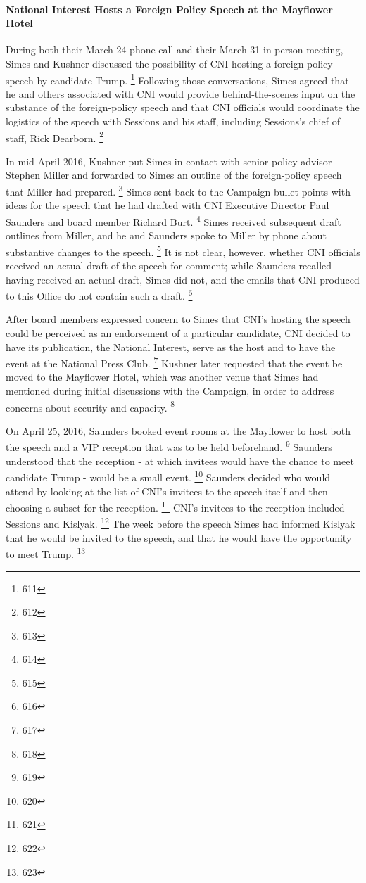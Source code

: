 \paragraph{National Interest Hosts a Foreign Policy Speech at the Mayflower Hotel}

During both their March 24 phone call and their March 31 in-person meeting, Simes and Kushner discussed the possibility of CNI hosting a foreign policy speech by candidate Trump.%
\footnote{611}
Following those conversations, Simes agreed that he and others associated with CNI would provide behind-the-scenes input on the substance of the foreign-policy speech and that CNI officials would coordinate the logistics of the speech with Sessions and his staff, including Sessions's chief of staff, Rick Dearborn.%
\footnote{612}

In mid-April 2016, Kushner put Simes in contact with senior policy advisor Stephen Miller and forwarded to Simes an outline of the foreign-policy speech that Miller had prepared.%
\footnote{613}
Simes sent back to the Campaign bullet points with ideas for the speech that he had drafted with CNI Executive Director Paul Saunders and board member Richard Burt.%
\footnote{614}
Simes received subsequent draft outlines from Miller, and he and Saunders spoke to Miller by phone about substantive changes to the speech.%
\footnote{615}
It is not clear, however, whether CNI officials received an actual draft of the speech for comment; while Saunders recalled having received an actual draft, Simes did not, and the emails that CNI produced to this Office do not contain such a draft.%
\footnote{616}

After board members expressed concern to Simes that CNI's hosting the speech could be perceived as an endorsement of a particular candidate, CNI decided to have its publication, the National Interest, serve as the host and to have the event at the National Press Club.%
\footnote{617}
Kushner later requested that the event be moved to the Mayflower Hotel, which was another venue that Simes had mentioned during initial discussions with the Campaign, in order to address concerns about security and capacity.%
\footnote{618}

On April 25, 2016, Saunders booked event rooms at the Mayflower to host both the speech and a VIP reception that was to be held beforehand.%
\footnote{619}
Saunders understood that the reception - at which invitees would have the chance to meet candidate Trump - would be a small event.%
\footnote{620}
Saunders decided who would attend by looking at the list of CNI's invitees to the speech itself and then choosing a subset for the reception.%
\footnote{621}
CNI's invitees to the reception included Sessions and Kislyak.%
\footnote{622}
The week before the speech Simes had informed Kislyak that he would be invited to the speech, and that he would have the opportunity to meet Trump.%
\footnote{623}


